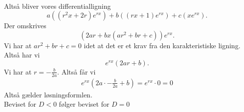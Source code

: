 \begin{sæt}
\begin{align*}
  \end{align*}
  Altså bliver vores differentialligning
  \[
  a\left( \left( r^2x+2r \right)e^{rx} \right) + b\left( \left( rx+1 \right) e^{rx}  \right) + c\left( xe^{rx}  \right)
  .\]
  Der omskrives
  \[
  \left(2ar+b x\left( ar^2 + br + c \right)\right)e^{rx} 
  .\]
  Vi har at $ar^2 +br+ c = 0$ idet at det er et krav fra den karakteristiske ligning. Altså har vi
  \[
  e^{rx}\left( 2ar + b \right) 
  .\]
  Vi har at $r = -\frac{b}{2a}$. Altså får vi
  \begin{align*}
  e^{rx} \left( 2a\cdot -\frac{b}{2a}+b \right) = e^{rx}\cdot 0 = 0  
  \end{align*}
  Altså gælder løsningsformlen. \\
  \hr
  Beviset for $D<0$ følger beviset for $D=0$
\end{sæt}

